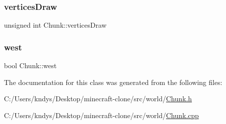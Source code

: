 \subsubsection{\texorpdfstring{vertices\+Draw}{verticesDraw}}
{\footnotesize\ttfamily unsigned int Chunk\+::vertices\+Draw}

\mbox{\label{class_chunk_a5b1b0c6494b0aacd9380d7a81dab031b}} 
\subsubsection{\texorpdfstring{west}{west}}
{\footnotesize\ttfamily bool Chunk\+::west}



The documentation for this class was generated from the following files\+:\begin{DoxyCompactItemize}
\item 
C\+:/\+Users/kndys/\+Desktop/minecraft-\/clone/src/world/\mbox{\hyperlink{_chunk_8h}{Chunk.\+h}}\item 
C\+:/\+Users/kndys/\+Desktop/minecraft-\/clone/src/world/\mbox{\hyperlink{_chunk_8cpp}{Chunk.\+cpp}}\end{DoxyCompactItemize}
